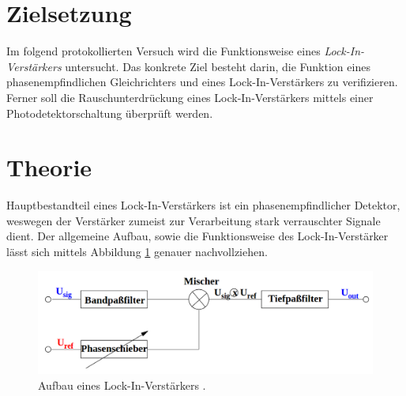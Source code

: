 %

%
\section{Zielsetzung}
\label{sec:Zielsetzung}

Im folgend protokollierten Versuch wird die Funktionsweise eines \emph{Lock-In-Verstärkers} untersucht.
Das konkrete Ziel besteht darin, die Funktion eines phasenempfindlichen Gleichrichters und eines Lock-In-Verstärkers
zu verifizieren. Ferner soll die Rauschunterdrückung eines Lock-In-Verstärkers mittels einer Photodetektorschaltung
überprüft werden.

\section{Theorie}
\label{sec:Theorie}

Hauptbestandteil eines Lock-In-Verstärkers ist ein phasenempfindlicher Detektor, weswegen der Verstärker zumeist zur 
Verarbeitung stark verrauschter Signale dient. Der allgemeine Aufbau, sowie die Funktionsweise des Lock-In-Verstärker lässt
sich mittels Abbildung \ref{fig:Versuchsaufbau} genauer nachvollziehen.

\begin{figure}[H]
    \centering
    \includegraphics[width=\textwidth]{./content/Versuchsaufbau.png}
    \caption{Aufbau eines Lock-In-Verstärkers \cite{Versuchsanleitung_v303}.}
    \label{fig:Versuchsaufbau}
\end{figure}

